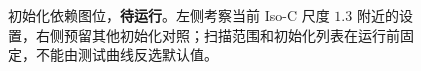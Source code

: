 \begin{figure}[!htbp]
  \centering
  \begin{minipage}[t]{0.485\linewidth}
  \end{minipage}\hfill
  \begin{minipage}[t]{0.485\linewidth}
  \end{minipage}
  \caption{初始化依赖图位，\textbf{待运行}。左侧考察当前 Iso-C 尺度 $1.3$ 附近的设置，右侧预留其他初始化对照；扫描范围和初始化列表在运行前固定，不能由测试曲线反选默认值。}
  \label{fig:ink-initialization-analysis}
\end{figure}
